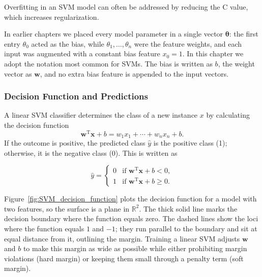 \documentclass[12pt,letter]{article}
\begin{document}
\begin{mdframed}[middlelinewidth=0.5mm]
\begin{center}
\end{center}
Overfitting in an SVM model can often be addressed by reducing the C value, which increases regularization.
\end{mdframed}


In earlier chapters we placed every model parameter in a single vector $\boldsymbol{\theta}$: the first entry $\theta_0$ acted as the bias, while $\theta_1,\dots,\theta_n$ were the feature weights, and each input was augmented with a constant bias feature $x_0 = 1$. In this chapter we adopt the notation most common for SVMs. The bias is written as $b$, the weight vector as $\mathbf{w}$, and no extra bias feature is appended to the input vectors.

\pagebreak

\subsubsection{Decision Function and Predictions}
A linear SVM classifier determines the class of a new instance $x$ by calculating the decision function
\begin{equation}
\textbf{w}^\text{T} \textbf{x} + b = w_1 x_1 + \cdots + w_n x_n + b.
\end{equation}
If the outcome is positive, the predicted class $\hat{y}$ is the positive class (1); otherwise, it is the negative class (0). This is written as 

\begin{equation}
  \hat{y} = 
  \begin{cases}
  0 & \text{if } \textbf{w}^\text{T} \textbf{x} + b < 0, \\
  1 & \text{if } \textbf{w}^\text{T} \textbf{x} + b \ge 0.
  \end{cases}
\label{eq:Linear_SVM_classifier_prediction}
\end{equation}

Figure~\ref{fig:SVM_decision_function} plots the decision function for a model with two features, so the surface is a plane in $\mathbb{R}^{2}$. The thick solid line marks the decision boundary where the function equals zero. The dashed lines show the loci where the function equals $1$ and $-1$; they run parallel to the boundary and sit at equal distance from it, outlining the margin. Training a linear SVM adjusts $\mathbf{w}$ and $b$ to make this margin as wide as possible while either prohibiting margin violations (hard margin) or keeping them small through a penalty term (soft margin).
\end{document}
